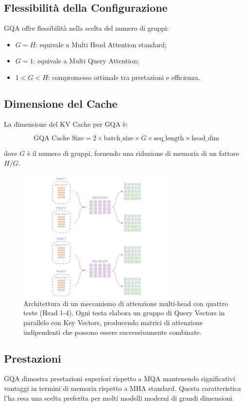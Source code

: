 \subsection{Flessibilità della Configurazione}
GQA offre flessibilità nella scelta del numero di gruppi:
\begin{itemize}
\item $G = H$: equivale a Multi Head Attention standard;
\item $G = 1$: equivale a Multi Query Attention;
\item $1 < G < H$: compromesso ottimale tra prestazioni e efficienza.
\end{itemize}

\subsection{Dimensione del Cache}
La dimensione del KV Cache per GQA è:

\begin{equation}
\text{GQA Cache Size} = 2 \times \text{batch\_size} \times G \times \text{seq\_length} \times \text{head\_dim}
\end{equation}

dove $G$ è il numero di gruppi, fornendo una riduzione di memoria di un fattore $H/G$.
\begin{figure}
    \centering
    \includegraphics[width=0.7\textwidth]{figure/GPA.png}
    \caption{Architettura di un meccanismo di attenzione multi-head con quattro teste (Head 1-4). Ogni testa elabora un gruppo di Query Vectors in parallelo con Key Vectors, producendo matrici di attenzione indipendenti che possono essere successivamente combinate.}
    \label{fig:gpa}
\end{figure}
\subsection{Prestazioni}
GQA dimostra prestazioni superiori rispetto a MQA mantenendo significativi vantaggi in termini di memoria rispetto a MHA standard. Questa caratteristica l'ha resa una scelta preferita per molti modelli moderni di grandi dimensioni.

